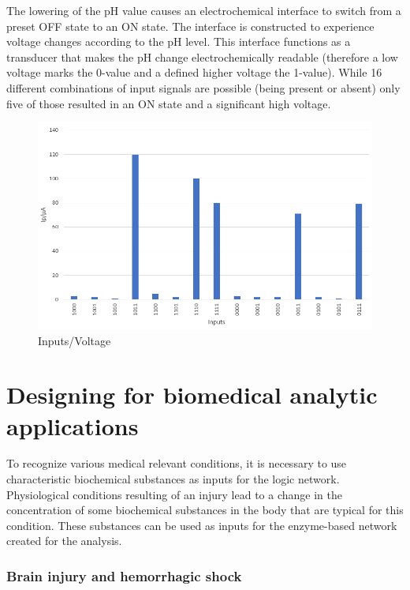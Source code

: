 \documentclass[runningheads]{llncs}
\begin{document}
		\noindent The lowering of the pH value causes an electrochemical interface to switch from a preset OFF state to an ON state. 
		The interface is constructed to experience voltage changes according to the pH level. This interface functions as a transducer that makes the pH change electrochemically readable (therefore a low voltage marks the 0-value and a defined higher voltage the 1-value). While 16 different combinations of input signals are possible (being present or absent) only five of those resulted in an ON state and a significant high voltage. \cite{original}
		
		\begin{figure}[H] \centering \includegraphics[scale= 0.37]{pics/pH.png} \caption{Inputs/Voltage} \label{img:ph} \end{figure}
	
	

\section{Designing for biomedical analytic applications}
	To recognize various medical relevant conditions, it is necessary to use characteristic biochemical substances as inputs for the logic network.
	Physiological conditions resulting of an injury lead to a change in the concentration of some biochemical substances in the body that are typical for this condition. These substances can be used as inputs for the enzyme-based network created for the analysis.
	
	
	\subsubsection{Brain injury and hemorrhagic shock}
	
\end{document}
